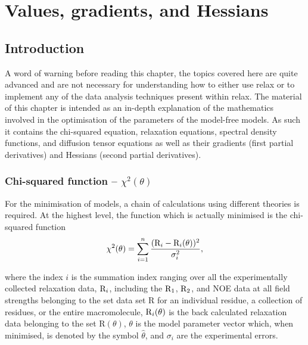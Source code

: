 
\chapter{Values, gradients, and Hessians}




\section{Introduction}


A word of warning before reading this chapter, the topics covered here are quite advanced and are not necessary for understanding how to either use relax or to implement any of the data analysis techniques present within relax.  The material of this chapter is intended as an in-depth explanation of the mathematics involved in the optimisation of the parameters of the model-free models.  As such it contains the chi-squared equation, relaxation equations, spectral density functions, and diffusion tensor equations as well as their gradients (first partial derivatives) and Hessians (second partial derivatives).



\subsection{Chi-squared function -- $\chi^2(\theta)$}

For the minimisation  of models, a chain of calculations using different theories is required.  At the highest level, the function which is actually minimised is the chi-squared function
\begin{equation} \label{eq: chi-squared}
 \chi^2(\theta) = \sum_{i=1}^n \frac{(\mathrm{R}_i - \mathrm{R}_i(\theta))^2}{\sigma_i^2},
\end{equation}

\noindent where the index $i$ is the summation index ranging over all the experimentally collected relaxation data, $\mathrm{R}_i$, including the $\mathrm{R}_1$, $\mathrm{R}_2$, and NOE data at all field strengths belonging to the set data set R for an individual residue, a collection of residues, or the entire macromolecule, $\mathrm{R}_i(\theta)$ is the back calculated relaxation data belonging to the set R$(\theta)$, $\theta$ is the model parameter vector which, when minimised, is denoted by the symbol $\hat\theta$, and $\sigma_i$ are the experimental errors.

